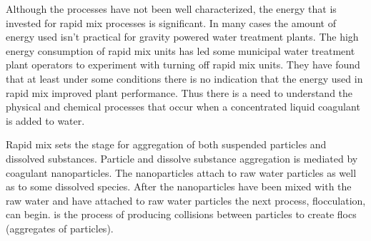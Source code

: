 \documentclass[letterpaper,10pt,english]{sphinxmanual}
\begin{document}
Although the processes have not been well characterized, the energy that is invested for rapid mix processes is significant. In many cases the amount of energy used isn’t practical for gravity powered water treatment plants. The high energy consumption of rapid mix units has led some municipal water treatment plant operators to experiment with turning off rapid mix units. They have found that at least under some conditions there is no indication that the energy used in rapid mix improved plant performance. Thus there is a need to understand the physical and chemical processes that occur when a concentrated liquid coagulant is added to water.

Rapid mix sets the stage for aggregation of both suspended particles and dissolved substances. Particle and dissolve substance aggregation is mediated by coagulant nanoparticles. The nanoparticles attach to raw water particles as well as to some dissolved species. After the nanoparticles have been mixed with the raw water and have attached to raw water particles the next process, flocculation, can begin.  {\hyperref[\detokenize{Flocculation/Floc_Intro:title-flocculation-introduction}]{}} is the process of producing collisions between particles to create flocs (aggregates of particles).
\end{document}
